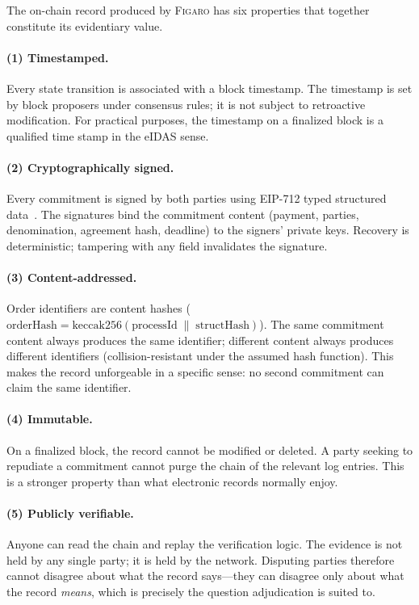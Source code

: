 \documentclass[11pt,a4paper]{article}
\theoremstyle{remark}
\newcommand{\figaro}{\textsc{Figaro}}
\begin{document}
The on-chain record produced by \figaro{} has six properties that
together constitute its evidentiary value.

\paragraph{(1) Timestamped.}
Every state transition is associated with a block timestamp. The
timestamp is set by block proposers under consensus rules; it is
not subject to retroactive modification. For practical purposes,
the timestamp on a finalized block is a qualified time stamp in
the eIDAS sense.

\paragraph{(2) Cryptographically signed.}
Every commitment is signed by both parties using EIP-712 typed
structured data~\citep{eip712}. The signatures bind the commitment
content (payment, parties, denomination, agreement hash, deadline)
to the signers' private keys. Recovery is deterministic; tampering
with any field invalidates the signature.

\paragraph{(3) Content-addressed.}
Order identifiers are content hashes
($\text{orderHash} = \mathrm{keccak256}(\text{processId} \;\|\;
\text{structHash})$). The same commitment content always produces
the same identifier; different content always produces different
identifiers (collision-resistant under the assumed hash
function). This makes the record unforgeable in a specific sense:
no second commitment can claim the same identifier.

\paragraph{(4) Immutable.}
On a finalized block, the record cannot be modified or deleted. A
party seeking to repudiate a commitment cannot purge the chain of
the relevant log entries. This is a stronger property than what
electronic records normally enjoy.

\paragraph{(5) Publicly verifiable.}
Anyone can read the chain and replay the verification logic. The
evidence is not held by any single party; it is held by the
network. Disputing parties therefore cannot disagree about what
the record says---they can disagree only about what the record
\emph{means}, which is precisely the question adjudication is
suited to.
\end{document}
